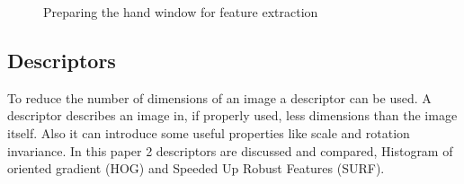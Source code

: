 \begin{figure}[tb]
\begin{center}
\hspace{0.03\linewidth}
\hspace{0.03\linewidth}
\caption{Preparing the hand window for feature extraction}
\label{fig:featureprep}
\end{center}
\end{figure}

\subsection*{Descriptors}
To reduce the number of dimensions of an image a descriptor can be used. A descriptor describes an image in, if properly used, less dimensions than the image itself. Also it can introduce some useful properties like scale and rotation invariance. In this paper 2 descriptors are discussed and compared, Histogram of oriented gradient \citep{NavneetDalal2006} (HOG) and Speeded Up Robust Features \citep{Bay2006} (SURF).

